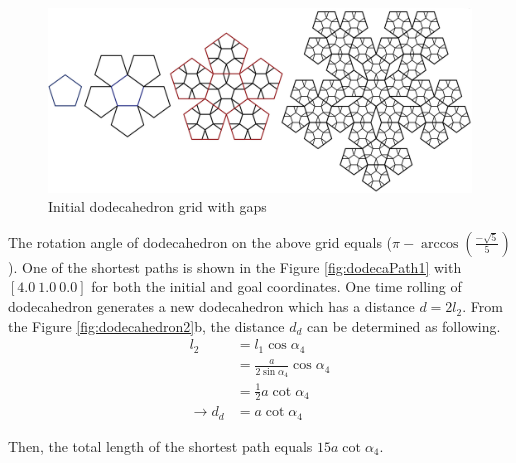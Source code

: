 %
\begin{figure}[h]
\centering
	\includegraphics[width=\textwidth]{image/dodecaGrid.png}
	\caption{Initial dodecahedron grid with gaps}
	\label{fig:dodecaGrid}
\end{figure}

\noindent The rotation angle of dodecahedron on the above grid equals 
($\pi-\arccos{(\frac{-\sqrt{5}}{5})}$). 
One of the shortest paths is shown in the Figure \ref{fig:dodecaPath1} with $[4.0\ 1.0\ 0.0]$ for both the initial and goal coordinates.
One time rolling of dodecahedron generates a new dodecahedron which has a distance $d=2l_2$. 
From the Figure \ref{fig:dodecahedron2}b, the distance $d_d$ can be determined as following.
\begin{equation*} 
\label{dodeca:eq4}
\begin{split}
l_2 & = l_1\cos{\alpha_4}\\
    & = \frac{a}{2\sin{\alpha_4}}\cos{\alpha_4}\\
    & = \frac{1}{2}a\cot{\alpha_4}\\
\rightarrow d_d & = a\cot{\alpha_4}
\end{split}
\end{equation*}

\noindent Then, the total length of the shortest path equals $15a\cot{\alpha_4}$.\\

